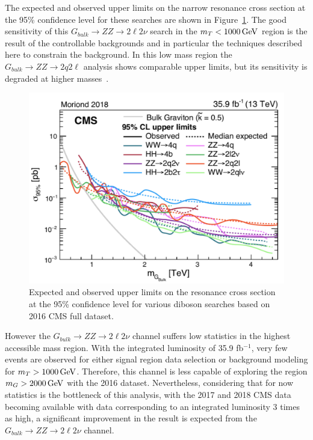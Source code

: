 The expected and observed upper limits on the narrow resonance cross section at the 95\% confidence level for these searches are shown in Figure~\ref{fig:sum_bulkGlimits}. The good sensitivity of this $G_{bulk}\rightarrow ZZ\rightarrow 2\ell 2\nu$ search in the $m_T < 1000\,\text{Ge\hspace{-.08em}V}$ region is the result of the controllable backgrounds and in particular the techniques described here to constrain the \Zjets background. In this low mass region the $G_{bulk}\rightarrow ZZ\rightarrow 2q 2\ell$ analysis shows comparable upper limits, but its sensitivity is degraded at higher masses~\cite{sum_zzqqll}.
\begin{figure}[htbp]
\begin{center}
\includegraphics[width=0.9\linewidth]{figures/sum_bulkGlimits.pdf}
\caption{Expected and observed upper limits on the resonance cross section at the 95\% confidence level for various diboson searches based on 2016 CMS full dataset.}
\label{fig:sum_bulkGlimits}
\end{center}
\end{figure}

\vspace{0.3cm}
However the $G_{bulk}\rightarrow ZZ\rightarrow 2\ell 2\nu$ channel suffers low statistics in the highest accessible mass region. With the integrated luminosity of 35.9 fb$^{-1}$, very few events are observed for either signal region data selection or background modeling for $m_T >1000\,\text{Ge\hspace{-.08em}V}$. Therefore, this channel is less capable of exploring the region $m_G >2000\,\text{Ge\hspace{-.08em}V}$ with the 2016 dataset. Nevertheless, considering that for now statistics is the bottleneck of this analysis, with the 2017 and 2018 CMS data becoming available with data corresponding to an integrated luminosity 3 times as high, a significant improvement in the result is expected from the $G_{bulk}\rightarrow ZZ\rightarrow 2\ell 2\nu$ channel.
